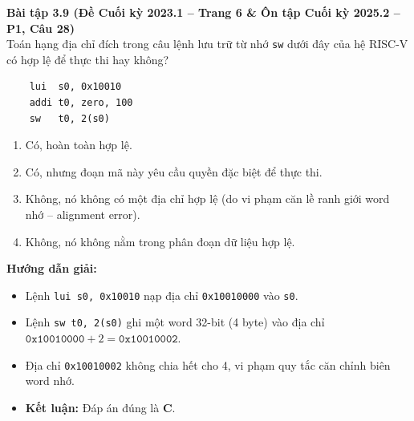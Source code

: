 \textbf{Bài tập 3.9 (Đề Cuối kỳ 2023.1 -- Trang 6 \& Ôn tập Cuối kỳ 2025.2 -- P1, Câu 28)}\\
Toán hạng địa chỉ đích trong câu lệnh lưu trữ từ nhớ \texttt{sw} dưới đây của hệ RISC-V có hợp lệ để thực thi hay không?
\begin{lstlisting}
    lui  s0, 0x10010
    addi t0, zero, 100
    sw   t0, 2(s0)
\end{lstlisting}
\begin{enumerate}[label=\Alph*.]
    \item Có, hoàn toàn hợp lệ.
    \item Có, nhưng đoạn mã này yêu cầu quyền đặc biệt để thực thi.
    \item Không, nó không có một địa chỉ hợp lệ (do vi phạm căn lề ranh giới word nhớ -- alignment error).
    \item Không, nó không nằm trong phân đoạn dữ liệu hợp lệ.
\end{enumerate}
\textbf{Hướng dẫn giải:}
\begin{itemize}
    \item Lệnh \texttt{lui s0, 0x10010} nạp địa chỉ \texttt{0x10010000} vào \texttt{s0}.
    \item Lệnh \texttt{sw t0, 2(s0)} ghi một word 32-bit (4 byte) vào địa chỉ $\texttt{0x10010000} + 2 = \texttt{0x10010002}$.
    \item Địa chỉ \texttt{0x10010002} không chia hết cho 4, vi phạm quy tắc căn chỉnh biên word nhớ.
    \item \textbf{Kết luận:} Đáp án đúng là \textbf{C}.
\end{itemize}

